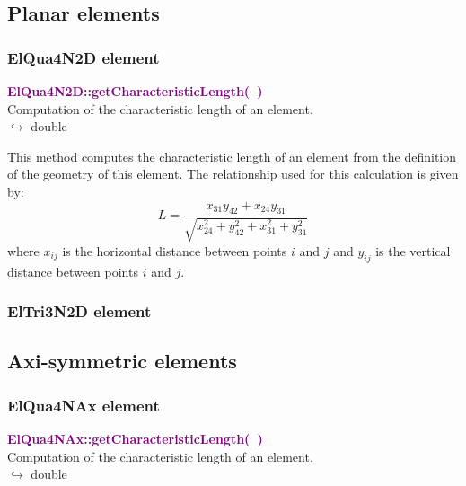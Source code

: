 \subsection{Planar elements}

\subsubsection{ElQua4N2D element}

\textcolor{purple}{\textbf{ElQua4N2D::getCharacteristicLength(~)}}\label{ElQua4N2D::getCharacteristicLength()}\\
Computation of the characteristic length of an element.\\ \hspace*{10mm}$\hookrightarrow$ double

This method computes the characteristic length of an element from the definition of the geometry of this element.
The relationship used for this calculation is given by:
\begin{equation}
L=\frac{x_{31} y_{42}+x_{24} y_{31}}{\sqrt{x_{24}^2+y_{42}^2+x_{31}^2+y_{31}^2}}
\end{equation}
where $x_{ij}$ is the horizontal distance between points $i$ and $j$ and $y_{ij}$ is the vertical distance between points $i$ and $j$.

\subsubsection{ElTri3N2D element}

\subsection{Axi-symmetric elements}

\subsubsection{ElQua4NAx element}

\textcolor{purple}{\textbf{ElQua4NAx::getCharacteristicLength(~)}}\label{ElQua4NAx::getCharacteristicLength()}\\
Computation of the characteristic length of an element.\\ \hspace*{10mm}$\hookrightarrow$ double

